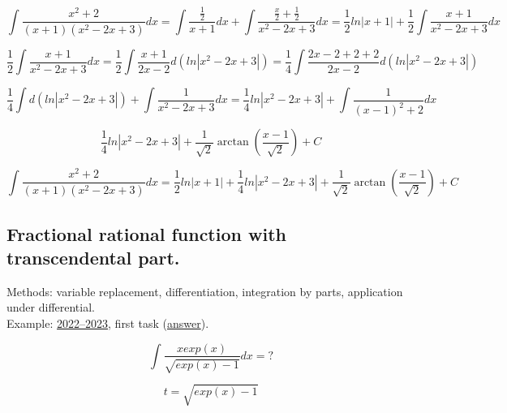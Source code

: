 \documentclass{article}
\begin{document}
\begin{equation*}
    \int \frac{x^2+2}{(x+1)(x^2-2x+3)}dx = \int \frac{\frac{1}{2}}{x+1}dx + \int \frac{\frac{x}{2}+\frac{1}{2}}{x^2-2x+3}dx = \frac{1}{2}ln|x+1| + \frac{1}{2} \int \frac{x+1}{x^2-2x+3}dx
\end{equation*}

\begin{equation*}
    \frac{1}{2} \int \frac{x+1}{x^2-2x+3}dx = \frac{1}{2} \int \frac{x+1}{2x-2}d(ln|x^2-2x+3|) = \frac{1}{4} \int \frac{2x-2+2+2}{2x-2}d(ln|x^2-2x+3|)
\end{equation*}

\begin{equation*}
    \frac{1}{4} \int d(ln|x^2-2x+3|) + \int \frac{1}{x^2-2x+3}dx = \frac{1}{4} ln|x^2-2x+3| + \int \frac{1}{(x-1)^2+2}dx
\end{equation*}

\begin{equation*}
    \frac{1}{4} ln|x^2-2x+3| + \frac{1}{\sqrt{2}} \arctan (\frac{x-1}{\sqrt{2}}) + C
\end{equation*}

\begin{equation}
    \int \frac{x^2+2}{(x+1)(x^2-2x+3)}dx = \frac{1}{2}ln|x+1| + \frac{1}{4} ln|x^2-2x+3| + \frac{1}{\sqrt{2}} \arctan (\frac{x-1}{\sqrt{2}}) + C
\end{equation}

\newpage

\subsection{Fractional rational function with transcendental part.}

Methods: variable replacement, differentiation, integration by parts, application under differential. \\
Example: \href{https://old.mipt.ru/education/chair/mathematics/exams/exams/2022-23/%D0%9C%D0%90%D0%98%D0%B8%D0%A0_%D0%92_23.pdf}{2022–2023}, first task (\href{https://old.mipt.ru/education/chair/mathematics/exams/exams/2022-23/%D0%9C%D0%90%D0%98%D0%B8%D0%A0_%D0%92_23%D0%BE%D1%82%D0%B2%D0%B5%D1%82%D1%8B.pdf}{answer}).

\begin{equation}
    \int \frac{x exp(x)}{\sqrt{exp(x)-1}}dx = ?
\end{equation}

\begin{equation}
    t = \sqrt{exp(x)-1}
\end{equation}
\end{document}
